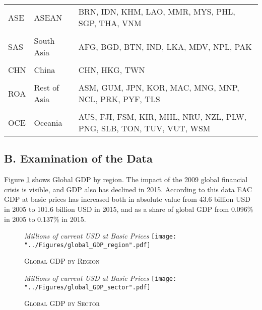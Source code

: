\documentclass[a4paper]{article}
\begin{document}
\begin{table}[h!]
{\begin{tabular}{llp{6cm}}
ASE & ASEAN & BRN, IDN, KHM, LAO, MMR, MYS, PHL, SGP, THA, VNM \\ \\
SAS & South Asia & AFG, BGD, BTN, IND, LKA, MDV, NPL, PAK \\ \\
CHN & China & CHN, HKG, TWN \\ \\
ROA & Rest of Asia & ASM, GUM, JPN, KOR, MAC, MNG, MNP, NCL, PRK, PYF, TLS \\ \\
OCE & Oceania & AUS, FJI, FSM, KIR, MHL, NRU, NZL, PLW, PNG, SLB, TON, TUV, VUT, WSM
 \\ \bottomrule
\end{tabular}
}
\end{table}
\FloatBarrier

\subsection*{B. Examination of the Data}
\setcounter{table}{0}
\renewcommand{\thetable}{B\arabic{table}}
\setcounter{figure}{0}
\renewcommand{\thefigure}{B\arabic{figure}}

Figure \ref{fig:wld_GDP_reg} shows Global GDP by region. The impact of the 2009 global financial crisis is visible, and GDP also has declined in 2015. %
According to this data EAC GDP at basic prices has increased both in absolute value from 43.6 billion USD in 2005 to 101.6 billion USD in 2015, and as a share of global GDP from 0.096\% in 2005 to 0.137\% in 2015. \newline

\begin{figure}[h!] \vspace{-6mm}
\centering
\caption{\label{fig:wld_GDP_reg}\textsc{Global GDP by Region}}
\small{\textit{Millions of current USD at Basic Prices}}
\texttt{[image: "../Figures/global\_GDP\_region".pdf]} %
\vspace{-8mm}
\end{figure}
\FloatBarrier

\begin{figure}[h!] \vspace{-5mm}
\centering
\caption{\label{fig:wld_GDP_sec}\textsc{Global GDP by Sector}}
\small{\textit{Millions of current USD at Basic Prices}}
\texttt{[image: "../Figures/global\_GDP\_sector".pdf]} %
\vspace{-20mm}
\end{figure}
\FloatBarrier
\newpage
\end{document}
